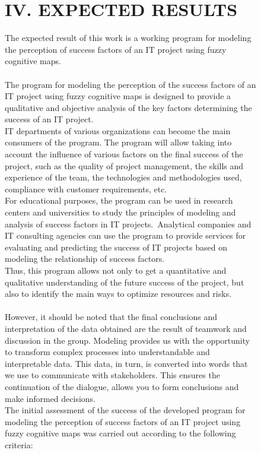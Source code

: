 \documentclass{article}
\begin{document}
\begin{figure}[!t]
\begin{minipage}{0.49\textwidth}
\begin{center}
                \chapter{IV. EXPECTED RESULTS}
            \end{center}
            The expected result of this work is a working program for modeling the perception of success factors of an IT project using fuzzy cognitive maps.\\
            ~\\
            The program for modeling the perception of the success factors of an IT project using fuzzy cognitive maps is designed to provide a qualitative and objective analysis of the key factors determining the success of an IT project.
            \\ IT departments of various organizations can become the main consumers of the program. The program will allow taking into account the influence of various factors on the final success of the project, such as the quality of project management, the skills and experience of the team, the technologies and methodologies used, compliance with customer requirements, etc.\\
            For educational purposes, the program can be used in research centers and universities to study the principles of modeling and analysis of success factors in IT projects.\
            Analytical companies and IT consulting agencies can use the program to provide services for evaluating and predicting the success of IT projects based on modeling the relationship of success factors.
            ~\\
            Thus, this program allows not only to get a quantitative and qualitative understanding of the future success of the project, but also to identify the main ways to optimize resources and risks.\\
            ~\\
            However, it should be noted that the final conclusions and interpretation of the data obtained are the result of teamwork and discussion in the group. Modeling provides us with the opportunity to transform complex processes into understandable and interpretable data. This data, in turn, is converted into words that we use to communicate with stakeholders. This ensures the continuation of the dialogue, allows you to form conclusions and make informed decisions.\\
            The initial assessment of the success of the developed program for modeling the perception of success factors of an IT project using fuzzy cognitive maps was carried out according to the following criteria:\\

\end{minipage}
\end{figure}
\end{document}
